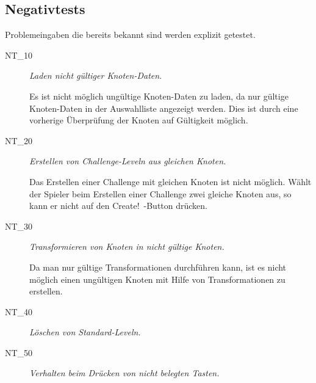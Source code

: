 %



\newpage



\subsection*{Negativtests}
\label{Abschnitt:Tests:Protokoll:Negativ}


Problemeingaben die bereits bekannt sind werden explizit getestet.\\

\begin{description}

	\item[NT\_10] \textit{Laden nicht gültiger Knoten-Daten.} \hfill\\
	
	\label{NT:10}
	
	Es ist nicht möglich ungültige Knoten-Daten zu laden, da nur gültige Knoten-Daten in der Auswahlliste angezeigt werden. Dies ist durch eine vorherige Überprüfung der Knoten auf Gültigkeit  möglich.
	
	\item[NT\_20] \textit{Erstellen von Challenge-Leveln aus gleichen Knoten.} \hfill\\
	
	\label{NT:20}
	
	Das Erstellen einer Challenge mit gleichen Knoten ist nicht möglich. Wählt der Spieler beim Erstellen einer Challenge zwei gleiche Knoten aus, so kann er nicht auf den \glqq Create!\grqq~-Button drücken.
	
	
	
	\item[NT\_30] \textit{Transformieren von Knoten in nicht gültige Knoten.} \hfill\\
	
	\label{NT:30}
	
	Da man nur gültige Transformationen durchführen kann, ist es nicht möglich einen ungültigen Knoten mit Hilfe von Transformationen zu erstellen.
	
	\item[NT\_40] \textit{Löschen von Standard-Leveln.} \hfill\\
	
	\label{NT:40}
	
	\item[NT\_50] \textit{Verhalten beim Drücken von nicht belegten Tasten.} \hfill\\
	
	\label{NT:50}	
	
\end{description}





